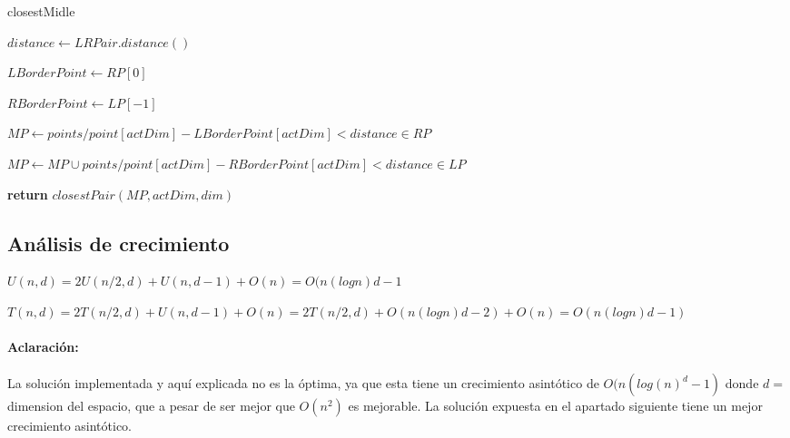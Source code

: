 \documentclass{article}
\begin{document}
		
		\begin{algorithm}

			\caption{closestMidle}

			\label{closestMidle}

			\begin{algorithmic}[1] %

			
				\State $distance \gets LRPair.distance()$

				\State $LBorderPoint \gets RP[0]$

				\State $RBorderPoint \gets LP[-1]$

				\State
				
				\State $MP \gets points/  point[actDim]-LBorderPoint[actDim] < distance \in RP$

				\State $MP \gets MP \cup points/  point[actDim]-RBorderPoint[actDim] < distance \in LP$

				\State	
								
				\State \textbf{return} $closestPair(MP, actDim, dim)$


			\EndProcedure

			\end{algorithmic}

		\end{algorithm}

	\subsection{Análisis de crecimiento}
	
	$U (n, d) = 2U (n/2, d) + U (n, d - 1) + O(n) = O(n(log n)d -1 $
	
	$T(n,d) = 2T(n/2,d) + U(n,d - 1) + O(n) = 2T (n/2, d) + O(n(log n)d-2) + O(n) = O(n(log n)d -1)$

	\paragraph{Aclaración:}
	La solución implementada y aquí explicada no es la óptima, ya que esta tiene un crecimiento asintótico de $O(n(log(n)^d-1)$ donde $d = $ dimension del espacio, que a pesar de ser mejor que $O(n^2)$ es mejorable. La solución expuesta en el apartado siguiente tiene un mejor crecimiento asintótico.
		
\end{document}
